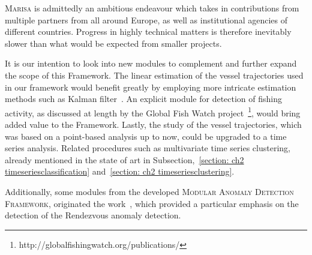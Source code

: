 \textsc{Marisa} is admittedly an ambitious endeavour which takes in contributions from multiple partners from all around Europe, as well as institutional agencies of different countries. Progress in highly technical matters is therefore inevitably slower than what would be expected from smaller projects.

It is our intention to look into new modules to complement and further expand the scope of this Framework. The linear estimation of the vessel trajectories used in our framework would benefit greatly by employing more intricate estimation methods such as Kalman filter~\cite{Borkowski2017TheFusion, Perera2012MaritimePrediction}. An explicit module for detection of fishing activity, as discussed at length by the Global Fish Watch project~\footnote{http://globalfishingwatch.org/publications/}, would bring added value to the Framework. Lastly, the study of the vessel trajectories, which was based on a point-based analysis up to now, could be upgraded to a time series analysis. Related procedures such as multivariate time series clustering, already mentioned in the state of art in Subsection,~\ref{section: ch2 timeseriesclassification} and~\ref{section: ch2 timeseriesclustering}.  

Additionally, some modules from the developed \textsc{Modular Anomaly Detection Framework}, originated the work~\cite{Machado2019VesselOutliers}, which provided a particular emphasis on the detection of the Rendezvous anomaly detection.